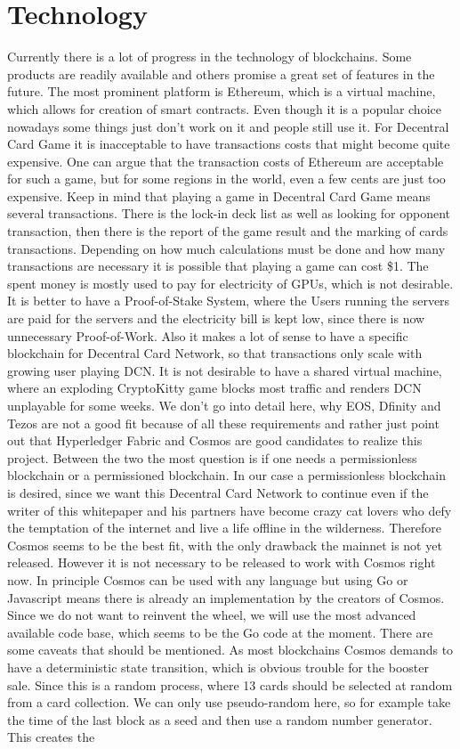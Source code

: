 \documentclass{article}
\begin{document}
\section{Technology}
%
Currently there is a lot of progress in the technology of blockchains. Some products are readily available and others promise a great set of features in the future. The most prominent platform is Ethereum, which is a virtual machine, which allows for creation of smart contracts. Even though it is a popular choice nowadays some things just don't work on it and people still use it. For Decentral Card Game it is inacceptable to have transactions costs that might become quite expensive. One can argue that the transaction costs of Ethereum are acceptable for such a game, but for some regions in the world, even a few cents are just too expensive. Keep in mind that playing a game in Decentral Card Game means several transactions. There is the lock-in deck list as well as looking for opponent transaction, then there is the report of the game result and the marking of cards transactions. Depending on how much calculations must be done and how many transactions are necessary it is possible that playing a game can cost \$1. The spent money is mostly used to pay for electricity of GPUs, which is not desirable. It is better to have a Proof-of-Stake System, where the Users running the servers are paid for the servers and the electricity bill is kept low, since there is now unnecessary Proof-of-Work. Also it makes a lot of sense to have a specific blockchain for Decentral Card Network, so that transactions only scale with growing user playing DCN. It is not desirable to have a shared virtual machine, where an exploding CryptoKitty game blocks most traffic and renders DCN unplayable for some weeks. We don't go into detail here, why EOS, Dfinity and Tezos are not a good fit because of all these requirements and rather just point out that Hyperledger Fabric and Cosmos\cite{cosmos} are good candidates to realize this project. Between the two the most question is if one needs a permissionless blockchain or a permissioned blockchain. In our case a permissionless blockchain is desired, since we want this Decentral Card Network to continue even if the writer of this whitepaper and his partners have become crazy cat lovers who defy the temptation of the internet and live a life offline in the wilderness. Therefore Cosmos seems to be the best fit, with the only drawback the mainnet is not yet released. However it is not necessary to be released to work with Cosmos right now. In principle Cosmos can be used with any language but using Go or Javascript means there is already an implementation by the creators of Cosmos. Since we do not want to reinvent the wheel, we will use the most advanced available code base, which seems to be the Go code at the moment. There are some caveats that should be mentioned. As most blockchains Cosmos demands to have a deterministic state transition, which is obvious trouble for the booster sale. Since this is a random process, where 13 cards should be selected at random from a card collection. We can only use pseudo-random here, so for example take the time of the last block as a seed and then use a random number generator. This creates the 
\end{document}
